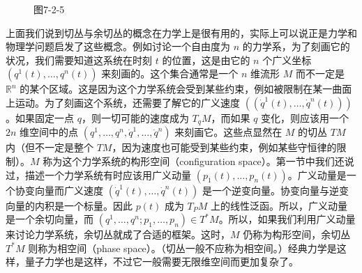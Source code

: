 \begin{figure}[htbp]
\centering
{}
\caption*{图7-2-5}
\end{figure}

上面我们说到切丛与余切丛的概念在力学上是很有用的，实际上可以说正是力学和物理学问题启发了这些概念。例如讨论一个自由度为 $n$ 的力学系，为了刻画它的状况，我们需要知道这系统在时刻 $t$ 的位置，这是由它的 $n$ 个广义坐标 $(q^1(t),\ldots,q^n(t))$ 来刻画的。这个集合通常是一个 $n$ 维流形 $M$ 而不一定是 $\mathbb R^n$ 的某个区域。这是因为这个力学系统会受到某些约束，例如被限制在某一曲面上运动。为了刻画这个系统，还需要了解它的广义速度 $((\dot q^1(t),\ldots,\dot q^n(t)))$。如果固定一点 $q$，则一切可能的速度成为 $T_qM$，而如果 $q$ 变化，则应该用一个 $2n$ 维空间中的点 $(q^1,\ldots,q^n,\dot q^1,\ldots,\dot q^n)$ 来刻画它。这些点显然在 $M$ 的切丛 $TM$ 内（但不一定是整个 $TM$，因为速度也可能受到某些约束，例如某些守恒律的限制）。$M$ 称为这个力学系统的构形空间（configuration space）。第一节中我们还说过，描述一个力学系统有时应该用广义动量 $(p_1(t),\ldots,p_n(t))$。广义动量是一个协变向量而广义速度 $(\dot q^1(t),\ldots,\dot q^n(t))$ 是一个逆变向量。协变向量与逆变向量的内积是一个标量。因此 $p(t)$ 成为 $T_PM$ 上的线性泛函。所以，广义动量是一个余切向量，而 $(q^1,\ldots,q^n;p_1,\ldots,p_n)\in T^*M$。所以，如果我们利用广义动量来讨论力学系统，余切丛就成了合适的框架。这时，$M$ 仍称为构形空间，余切丛 $T^*M$ 则称为相空间（phase space）。（切丛一般不应称为相空间。）经典力学是这样，量子力学也是这样，不过它一般需要无限维空间而更加复杂了。

